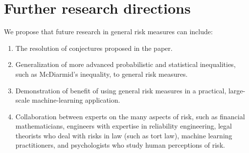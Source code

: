\section{Further research directions}
We propose that future research in general risk measures can include: 
\begin{enumerate}
	\item The resolution of conjectures proposed in the paper.
	\item Generalization of more advanced probabilistic and statistical inequalities, such as McDiarmid's inequality, to general risk measures.
	\item Demonstration of benefit of using general risk measures in a practical, large-scale machine-learning application.
	\item Collaboration between experts on the many aspects of risk, such as financial mathematicians, engineers with expertise in reliability engineering, legal theorists who deal with risks in law (such as tort law), machine learning practitioners, and psychologists who study human perceptions of risk.
\end{enumerate}

